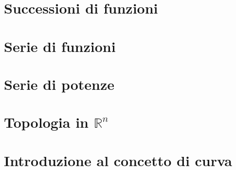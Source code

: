 \documentclass[a4paper, 10pt, twoside]{article}
\begin{document}

\part{Successioni di funzioni}









\clearpage
\part{Serie di funzioni}





\clearpage
\part{Serie di potenze}



\clearpage
\part{Topologia in \texorpdfstring{$\mathbb{R}^n$}{Rⁿ}}



\clearpage
\part{Introduzione al concetto di curva}


\end{document}
